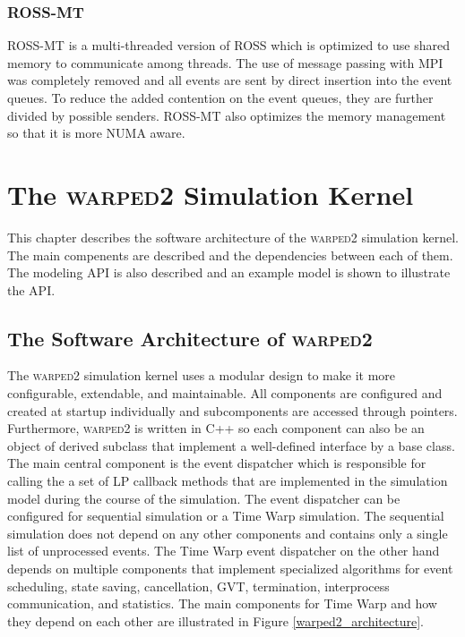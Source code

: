 \documentclass[11pt]{book}
\begin{document}
\subsection{ROSS-MT}

ROSS-MT \cite{jagtap-12} is a multi-threaded version of ROSS which is optimized to use
shared memory to communicate among threads.  The use of message passing with MPI was
completely removed and all events are sent by direct insertion into the event queues.  To
reduce the added contention on the event queues, they are further divided by possible
senders.  ROSS-MT also optimizes the memory management so that it is more NUMA aware.



\chapter[\textsc{warped2}]{The \textsc{warped2} Simulation Kernel}\label{warped2_overview}

This chapter describes the software architecture of the \textsc{warped2} simulation kernel.
The main compenents are described and the dependencies between each of them.  The modeling API
is also described and an example model is shown to illustrate the API.

\section{The Software Architecture of \textsc{warped2}}

The \textsc{warped2} simulation kernel uses a modular design to make it more configurable,
extendable, and maintainable.  All components are configured and created at startup individually
and subcomponents are accessed through pointers.  Furthermore, \textsc{warped2} is written in
C++ so each component can also be an object of derived subclass that implement a well-defined
interface by a base class.  The main central component is the event dispatcher which is responsible
for calling the a set of LP callback methods that are implemented in the simulation model during
the course of the simulation.  The event dispatcher can be configured for sequential simulation
or a Time Warp simulation.  The sequential simulation does not depend on any other components and
contains only a single list of unprocessed events.  The Time Warp event dispatcher on the other
hand depends on multiple components that implement specialized algorithms for event scheduling,
state saving, cancellation, GVT, termination, interprocess communication, and statistics.  The
main components for Time Warp and how they depend on each other are illustrated in Figure
\ref{warped2_architecture}.
\end{document}
